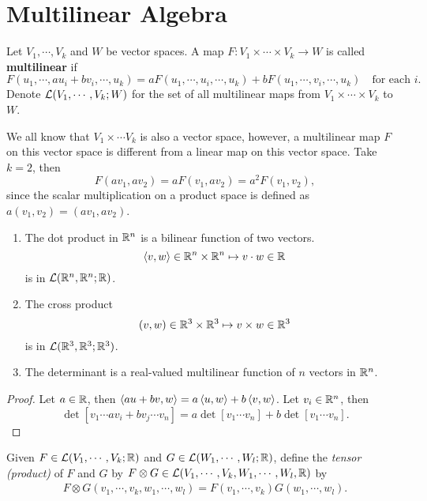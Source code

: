 \section{Multilinear Algebra}

\begin{definition}
Let $V_1, \cdots, V_k$ and $W$ be vector spaces. A map $F:V_1 \times \cdots \times V_k \to W$ is called \textbf{multilinear} if 
$$F(u_1, \cdots, au_i + bv_i, \cdots, u_k) = aF(u_1, \cdots, u_i, \cdots, u_k) + 
bF(u_1, \cdots, v_i, \cdots, u_k) \quad \text{for each }i. $$
Denote $\mathcal{L}(V_1, \cdots, V_k;W)$ for the set of all multilinear maps from $V_1 \times \cdots \times V_k$ to $W$. 
\end{definition}

\begin{remark}
    We all know that $V_1 \times \cdots V_k$ is also a vector space, however, a multilinear map $F$ on this vector space is different from a linear map on this vector space. Take $k=2$, then 
    $$F(av_1, av_2) = aF(v_1, av_2) = a^2 F(v_1, v_2), $$
    since the scalar multiplication on a product space is defined as $a(v_1, v_2) = (av_1, av_2)$. 
\end{remark}
\begin{example}
    \begin{enumerate}
    \item The dot product in $\mathbb{R}^n$ is a bilinear function of two vectors. 
    $$\left\langle v,w \right\rangle \in \mathbb{R}^n \times \mathbb{R}^n \mapsto v \cdot w \in \mathbb{R}$$ is in $\mathcal{L}(\mathbb{R}^n, \mathbb{R}^n; \mathbb{R})$.
    \item The cross product 
    $$(v,w) \in \mathbb{R}^3 \times \mathbb{R}^3 \mapsto v \times w \in \mathbb{R}^3 $$ is in $\mathcal{L}(\mathbb{R}^3, \mathbb{R}^3; \mathbb{R}^3)$.
    \item The determinant is a real-valued multilinear function of $n$ vectors in $\mathbb{R}^n$. 
    \end{enumerate}
\end{example}
\begin{proof}
    Let $a \in \mathbb{R}$, then $\left\langle au+bv, w \right\rangle = a\left\langle u, w \right\rangle + b\left\langle v, w \right\rangle$. Let $v_i \in \mathbb{R}^n$, then 
    $$\det [v_1 \cdots av_i+bv_j \cdots v_n ] = a\det[v_1 \cdots v_n] + b\det [v_1 \cdots v_n]. $$
\end{proof}
\begin{definition}
    Given $F \in \mathcal{L}(V_1, \cdots, V_k; \mathbb{R})$ and $G \in \mathcal{L}(W_1, \cdots, W_l; \mathbb{R})$, define the \textit{tensor (product)} of $F$ and $G$ by $F \otimes G \in \mathcal{L}(V_1, \cdots, V_k, W_1, \cdots, W_l, \mathbb{R})$ by 
    \begin{align*}
    F \otimes G(v_1, \cdots, v_k, w_1, \cdots, w_l) = F(v_1, \cdots, v_k)G(w_1, \cdots, w_l).
    \end{align*}
\end{definition}

